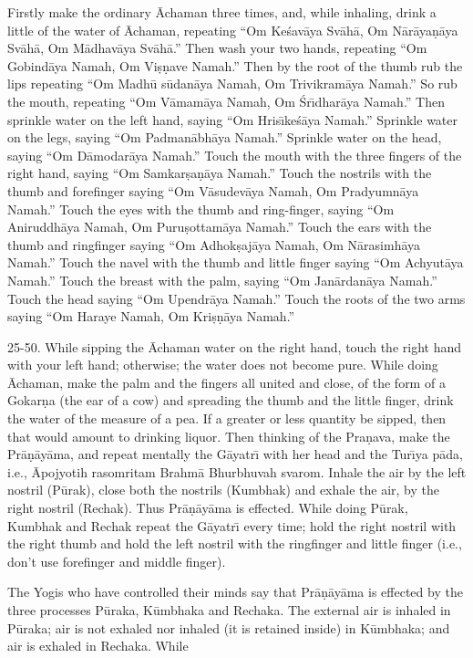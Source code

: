 Firstly make the ordinary \=Achaman three times, and, while inhaling, drink a little of the water of \=Achaman, repeating ``Om Ke\'sav\=aya Sv\=ah\=a, Om N\=ar\=aya\d{n}\=aya Sv\=ah\=a, Om M\=adhav\=aya Sv\=ah\=a.'' Then wash your two hands, repeating ``Om Gobind\=aya Namah, Om Vi\d{s}\d{n}ave Namah.'' Then by the root of the thumb rub the lips repeating ``Om Madh\=u s\=udan\=aya Namah, Om Trivikram\=aya Namah.'' So rub the mouth, repeating ``Om V\=amam\=aya Namah, Om \'Sr\={\i}dhar\=aya Namah.'' Then sprinkle water on the left hand, saying ``Om Hris\={\i}ke\'s\=aya Namah.'' Sprinkle water on the legs, saying ``Om Padman\=abh\=aya Namah.'' Sprinkle water on the head, saying ``Om D\=amodar\=aya Namah.'' Touch the mouth with the three fingers of the right hand, saying ``Om Samkar\d{s}a\d{n}\=aya Namah.'' Touch the nostrils with the thumb and forefinger saying ``Om V\=asudev\=aya Namah, Om Pradyumn\=aya Namah.'' Touch the eyes with the thumb and ring-finger, saying ``Om Aniruddh\=aya Namah, Om Puru\d{s}ottam\=aya Namah.'' Touch the ears with the thumb and ringfinger saying ``Om Adhok\d{s}aj\=aya Namah, Om N\=arasimh\=aya Namah.'' Touch the navel with the thumb and little finger saying ``Om Achyut\=aya Namah.'' Touch the breast with the palm, saying ``Om Jan\=ardan\=aya Namah.'' Touch the head saying ``Om Upendr\=aya Namah.'' Touch the roots of the two arms saying ``Om Haraye Namah, Om Kri\d{s}\d{n}\=aya Namah.''

25-50. While sipping the \=Achaman water on the right hand, touch the right hand with your left hand; otherwise; the water does not become pure. While doing \=Achaman, make the palm and the fingers all united and close, of the form of a Gokar\d{n}a (the ear of a cow) and spreading the thumb and the little finger, drink the water of the measure of a pea. If a greater or less quantity be sipped, then that would amount to drinking liquor. Then thinking of the Pra\d{n}ava, make the Pr\=a\d{n}\=ay\=ama, and repeat mentally the G\=ayatr\={\i} with her head and the Tur\={\i}ya p\=ada, i.e., \=Apojyotih rasomritam Brahm\=a Bhurbhuvah svarom. Inhale the air by the left nostril (P\=urak), close both the nostrils (Kumbhak) and exhale the air, by the right nostril (Rechak). Thus Pr\=a\d{n}\=ay\=ama is effected. While doing P\=urak, Kumbhak and Rechak repeat the G\=ayatr\={\i} every time; hold the right nostril with the right thumb and hold the left nostril with the ringfinger and little finger (i.e., don't use forefinger and middle finger).

The Yogis who have controlled their minds say that Pr\=a\d{n}\=ay\=ama is effected by the three processes P\=uraka, K\=umbhaka and Rechaka. The external air is inhaled in P\=uraka; air is not exhaled nor inhaled (it is retained inside) in K\=umbhaka; and air is exhaled in Rechaka. While

